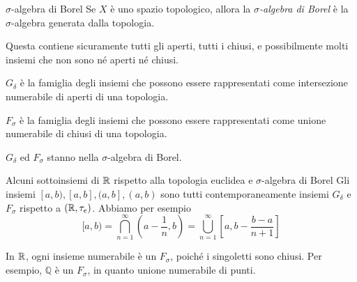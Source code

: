 \documentclass[a4paper]{article}
\begin{document}
\begin{radioactive}
\begin{snippetdefinition}{\(\sigma\)-algebra di Borel}
    Se \(X\) è uno spazio topologico, allora
    la \emph{\(\sigma\)-algebra di Borel} è la \(\sigma\)-algebra generata dalla topologia.
\end{snippetdefinition}
\end{radioactive}

\begin{radioactive}
Questa contiene sicuramente tutti gli aperti, tutti i chiusi, e possibilmente
molti insiemi che non sono né aperti né chiusi.
\end{radioactive}

\begin{radioactive}
\begin{snippetdefinition}{}
    \(G_\delta\) è la famiglia degli insiemi che possono essere rappresentati
    come intersezione numerabile di aperti di una topologia.
\end{snippetdefinition}
\end{radioactive}

\begin{radioactive}
\begin{snippetdefinition}{}
    \(F_\sigma\) è la famiglia degli insiemi che possono essere rappresentati
    come unione numerabile di chiusi di una topologia.
\end{snippetdefinition}
\end{radioactive}

\begin{radioactive}
\(G_\delta\) ed \(F_\sigma\) stanno nella \(\sigma\)-algebra di Borel.
\end{radioactive}

\begin{radioactive}
\begin{snippetexample}{Alcuni sottoinsiemi di \(\mathbb{R}\) rispetto alla topologia euclidea e \(\sigma\)-algebra di Borel}
    Gli insiemi \([a,b), [a,b], (a,b], (a,b)\)
    sono tutti contemporaneamente insiemi \(G_\delta\) e \(F_\sigma\)
    rispetto a \((\mathbb{R}, \tau_e)\).
    Abbiamo per esempio
    \[
        [a,b) = \bigcap_{n=1}^\infty \left(a-\frac1n,b\right)
        = \bigcup_{n=1}^\infty \left[a,b-\frac{b-a}{n+1}\right]
    \]
\end{snippetexample}
\end{radioactive}

\begin{radioactive}
In \(\mathbb{R}\), ogni insieme numerabile è un \(F_\sigma\), poiché i singoletti sono chiusi.
Per esempio, \(\mathbb{Q}\) è un \(F_\sigma\), in quanto unione numerabile di punti.
\end{radioactive}
\end{document}
